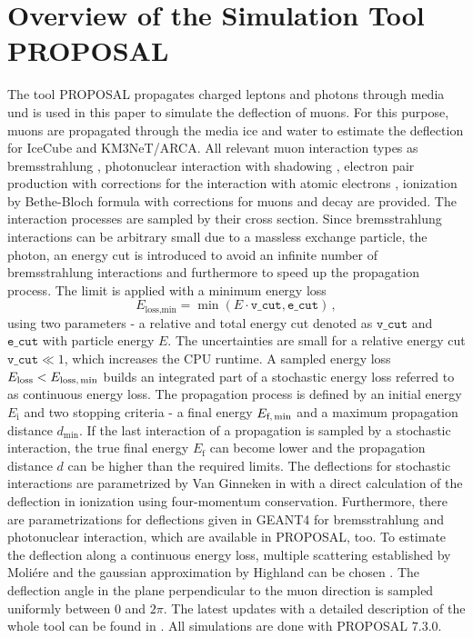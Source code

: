 \section{Overview of the Simulation Tool PROPOSAL}\label{sec:proposal}
The tool PROPOSAL propagates charged leptons and photons through media und is 
used in this paper to simulate the deflection of muons. For this purpose, 
muons are propagated through the media ice and water 
to estimate the deflection for IceCube and KM3NeT/ARCA. All relevant muon interaction types 
as bremsstrahlung \cite{KKP_1995, Karnaukhov_1999}, photonuclear interaction \cite{Abramowicz_1997} with 
shadowing \cite{ButkevichMikheyev_2002}, electron pair production \cite{KKP_proc} with corrections for the 
interaction with atomic electrons \cite{Kelner_1998}, 
ionization by Bethe-Bloch formula with corrections for muons \cite{Rossi} and decay are provided. The interaction processes are sampled by their cross section. Since bremsstrahlung interactions can be 
arbitrary small due to a massless exchange particle, the photon, an energy cut is introduced to avoid an infinite number of bremsstrahlung interactions 
and furthermore to speed up the propagation process. 
The limit is applied with a minimum energy loss
\begin{equation}
    E_{\text{loss,min}} = \min{(E \cdot \texttt{v\_cut}, \texttt{e\_cut})}\,,
\end{equation}
using two parameters - a relative and total energy cut denoted as 
$\texttt{v\_cut}$ and $\texttt{e\_cut}$ with particle energy $E$. The uncertainties are small 
for a relative energy cut $\texttt{v\_cut}\ll 1$, which increases the 
CPU runtime.
A sampled energy loss 
$E_{\text{loss}} < E_{\text{loss,\,min}}$ builds an integrated part of a 
stochastic energy loss referred to as continuous energy loss. The 
propagation process is defined by an initial energy $E_{\text{i}}$ and 
two stopping criteria - a final energy $E_{\text{f,\,min}}$ and a 
maximum propagation distance $d_{\text{min}}$. If the last interaction of 
a propagation is sampled by a stochastic interaction, the true final energy 
$E_{\text{f}}$ can become lower and the 
propagation distance $d$ can be higher than the required limits. 
The deflections for stochastic interactions are parametrized by Van Ginneken 
in \cite{Van_Ginneken} with a direct calculation of the deflection in 
ionization using four-momentum conservation. 
Furthermore, there are parametrizations for deflections given in GEANT4 \cite{GEANT4} 
for bremsstrahlung and photonuclear interaction, which 
are available in PROPOSAL, too.
To estimate the deflection along 
a continuous energy loss, multiple scattering established by Moliére 
\cite{moliere_scattering} and the gaussian approximation by Highland 
can be chosen \cite{HIGHLAND_1975}. 
The deflection angle in the plane perpendicular to the muon direction is 
sampled uniformly between $0$ and $2\pi$.
The latest updates with a detailed description of the whole tool can be found 
in \cite{phd_soedingrekso}.
All simulations are done with PROPOSAL $7.3.0$.

